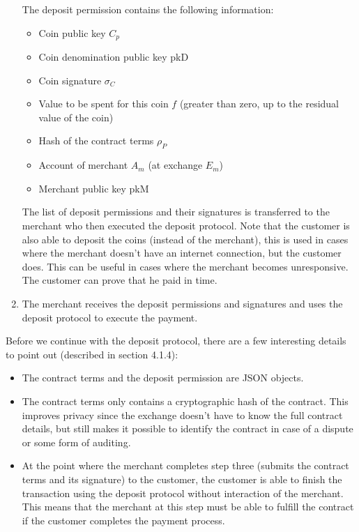\begin{enumerate}
          The deposit permission contains the following information:
          \begin{itemize}
              \item Coin public key $ C_p $
              \item Coin denomination public key pkD
              \item Coin signature $ \sigma_C $
              \item Value to be spent for this coin $f$ (greater than zero, up to the residual value of the coin)
              \item Hash of the contract terms $ \rho_P $
              \item Account of merchant $A_m$ (at exchange $E_m$)
              \item Merchant public key pkM
          \end{itemize}
          The list of deposit permissions and their signatures is transferred to the merchant who then executed the deposit protocol.
          Note that the customer is also able to deposit the coins (instead of the merchant), this is used in cases where the merchant doesn't have an internet connection, but the customer does.
          This can be useful in cases where the merchant becomes unresponsive.
          The customer can prove that he paid in time.
    \item The merchant receives the deposit permissions and signatures and uses the deposit protocol to execute the payment.
\end{enumerate}

Before we continue with the deposit protocol, there are a few interesting details to point out (described in \cite{dold:the-gnu-taler-system} section 4.1.4):
\begin{itemize}
    \item The contract terms and the deposit permission are \ac{JSON} objects.
    \item The contract terms only contains a cryptographic hash of the contract.
          This improves privacy since the exchange doesn't have to know the full contract details, but still makes it possible to identify the contract in case of a dispute or some form of auditing.
    \item At the point where the merchant completes step three (submits the contract terms and its signature) to the customer, the customer is able to finish the transaction using the deposit protocol without interaction of the merchant.
          This means that the merchant at this step must be able to fulfill the contract if the customer completes the payment process.
\end{itemize}

